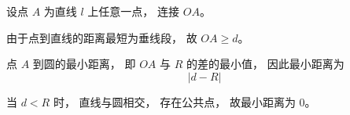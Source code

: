 \begin{proofbox}
设点 $A$ 为直线 $l$ 上任意一点，
连接 $OA$。

由于点到直线的距离最短为垂线段，
故 $OA \ge d$。

点 $A$ 到圆的最小距离，
即 $OA$ 与 $R$ 的差的最小值，
因此最小距离为
\[
|d-R|
\]

当 $d<R$ 时，
直线与圆相交，
存在公共点，
故最小距离为 $0$。
\end{proofbox}
